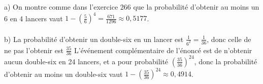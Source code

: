 a) On montre comme dans l'exercice 266 que la probabilité d'obtenir au moins un 6 en 4 lancers vaut $1-\left(\frac{5}{6}\right)^4 = \frac{671}{1296}\approx 0,5177$. \\ \\
b) La probabilité d'obtenir un double-six en un lancer est $\frac{1}{6^2}=\frac{1}{36}$, donc celle de ne pas l'obtenir est $\frac{35}{36}$ L'événement complémentaire de l’énoncé est de n'obtenir aucun double-six en 24  lancers, et a pour probabilité $\left(\frac{35}{36}\right)^{24}$, donc la probabilité d'obtenir au moins un double-six vaut $1-\left(\frac{35}{36}\right)^{24} \approx 0,4914$.
